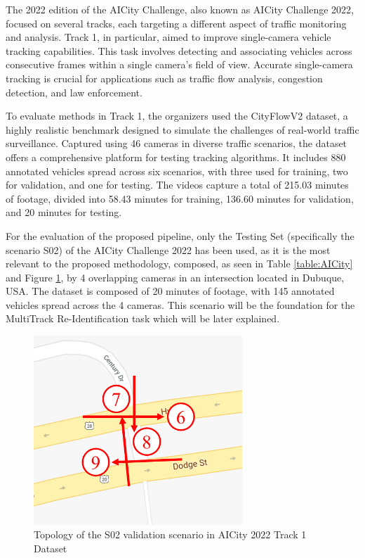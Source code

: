 The 2022 edition of the AICity Challenge, also known as AICity Challenge 2022, focused on several tracks, each targeting a different aspect of traffic monitoring and analysis. Track 1, in particular, aimed to improve single-camera vehicle tracking capabilities. This task involves detecting and associating vehicles across consecutive frames within a single camera's field of view. Accurate single-camera tracking is crucial for applications such as traffic flow analysis, congestion detection, and law enforcement.

To evaluate methods in Track 1, the organizers used the CityFlowV2 dataset, a highly realistic benchmark designed to simulate the challenges of real-world traffic surveillance. Captured using 46 cameras in diverse traffic scenarios, the dataset offers a comprehensive platform for testing tracking algorithms. It includes 880 annotated vehicles spread across six scenarios, with three used for training, two for validation, and one for testing. The videos capture a total of 215.03 minutes of footage, divided into 58.43 minutes for training, 136.60 minutes for validation, and 20 minutes for testing.

For the evaluation of the proposed pipeline, only the Testing Set (specifically the scenario S02) of the AICity Challenge 2022 has been used, as it is the most relevant to the proposed methodology, composed, as seen in Table \ref{table:AICity} and Figure \ref{fig:AICityS02}, by 4 overlapping cameras in an intersection located in Dubuque, USA. The dataset is composed of 20 minutes of footage, with 145 annotated vehicles spread across the 4 cameras. This scenario will be the foundation for the MultiTrack Re-Identification task which will be later explained.

\begin{figure}[ht]
    \centering
    \includegraphics[width=0.7\textwidth]{images/AICityS02.jpg}
    \caption[Topology of an AICity 2022 validation scenario]{Topology of the S02 validation scenario in AICity 2022 Track 1 Dataset}
    \label{fig:AICityS02}
\end{figure}

